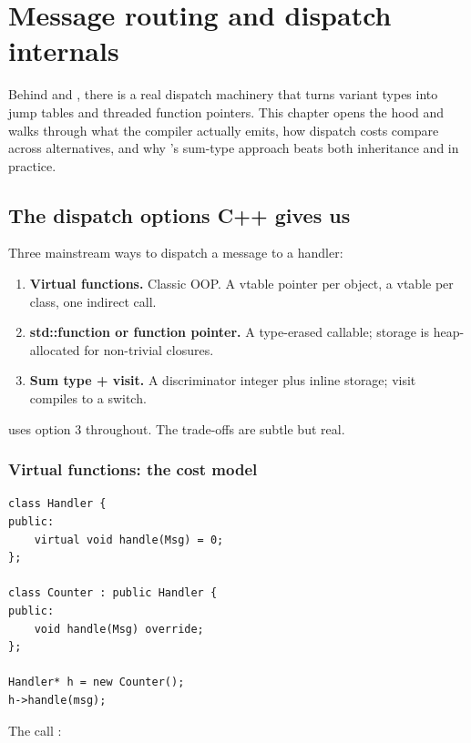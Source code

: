 \chapter{Message routing and dispatch internals}
\label{ch:dispatch}

\begin{aside}
Behind  and , there is a real
dispatch machinery that turns variant types into jump tables and
threaded function pointers. This chapter opens the hood and walks
through what the compiler actually emits, how dispatch costs
compare across alternatives, and why \maya{}'s sum-type approach
beats both inheritance and  in practice.
\end{aside}

\section{The dispatch options C++ gives us}

Three mainstream ways to dispatch a message to a handler:

\begin{enumerate}[leftmargin=*]
  \item \textbf{Virtual functions.} Classic OOP. A vtable pointer
    per object, a vtable per class, one indirect call.
  \item \textbf{std::function or function pointer.} A type-erased
    callable; storage is heap-allocated for non-trivial
    closures.
  \item \textbf{Sum type + visit.} A discriminator integer plus
    inline storage; visit compiles to a switch.
\end{enumerate}

\maya{} uses option 3 throughout. The trade-offs are subtle but
real.

\subsection*{Virtual functions: the cost model}

\begin{lstlisting}
class Handler {
public:
    virtual void handle(Msg) = 0;
};

class Counter : public Handler {
public:
    void handle(Msg) override;
};

Handler* h = new Counter();
h->handle(msg);
\end{lstlisting}

The call :

